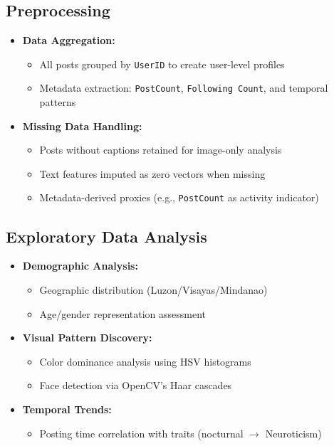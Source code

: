 \subsection{Preprocessing}
\label{subsec:preprocessing}

\begin{itemize}
	\item \textbf{Data Aggregation:} 
	\begin{itemize}
		\item All posts grouped by \texttt{UserID} to create user-level profiles
		\item Metadata extraction: \texttt{PostCount}, \texttt{Following Count}, and temporal patterns
	\end{itemize}
	
	\item \textbf{Missing Data Handling:}
	\begin{itemize}
		\item Posts without captions retained for image-only analysis
		\item Text features imputed as zero vectors when missing
		\item Metadata-derived proxies (e.g., \texttt{PostCount} as activity indicator)
	\end{itemize}
\end{itemize}

\subsection{Exploratory Data Analysis}
\label{subsec:eda}

\begin{itemize}
	\item \textbf{Demographic Analysis:} 
	\begin{itemize}
		\item Geographic distribution (Luzon/Visayas/Mindanao)
		\item Age/gender representation assessment
	\end{itemize}
	
	\item \textbf{Visual Pattern Discovery:}
	\begin{itemize}
		\item Color dominance analysis using HSV histograms
		\item Face detection via OpenCV's Haar cascades
	\end{itemize}
	
	\item \textbf{Temporal Trends:}
	\begin{itemize}
		\item Posting time correlation with traits (nocturnal $\rightarrow$ Neuroticism)
	\end{itemize}
\end{itemize}

